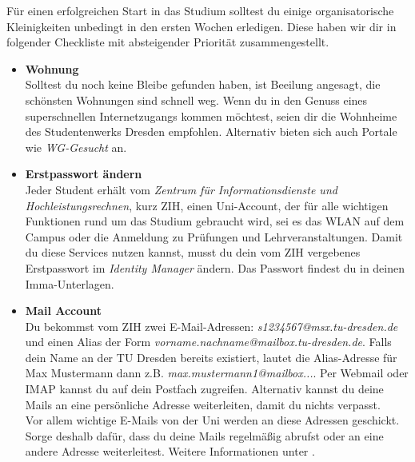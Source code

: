 \newcommand{\checkbox}[1]{\item[$\square$]\textbf{#1}\\}


Für einen erfolgreichen Start in das Studium solltest du einige organisatorische Kleinigkeiten unbedingt in den ersten Wochen erledigen.
Diese haben wir dir in folgender Checkliste mit absteigender Priorität zusammengestellt.

\begin{itemize}[leftmargin=*]

\checkbox{Wohnung}
Solltest du noch keine Bleibe gefunden haben, ist Beeilung angesagt, die schönsten Wohnungen sind schnell weg.
Wenn du in den Genuss eines superschnellen Internetzugangs kommen möchtest, seien dir die Wohnheime  des Studentenwerks Dresden empfohlen. Alternativ bieten sich auch Portale wie \textit{WG-Gesucht}  an.

\checkbox{Erstpasswort ändern}
Jeder Student erhält vom \textit{Zentrum für Informationsdienste und Hochleistungsrechnen}, kurz ZIH, einen Uni-Account, der für alle wichtigen Funktionen rund um das Studium gebraucht wird, sei es das WLAN auf dem Campus oder die Anmeldung zu Prüfungen und Lehrveranstaltungen.
Damit du diese Services nutzen kannst, musst du dein vom ZIH vergebenes Erstpasswort im \textit{Identity Manager}  ändern. Das Passwort findest du in deinen Imma-Unterlagen.

\checkbox{Mail Account}
Du bekommst vom ZIH zwei E-Mail-Adressen:
\textit{s1234567@msx.tu-dresden.de} und einen Alias der Form \textit{vorname.nachname@mailbox.tu-dresden.de}.
Falls dein Name an der TU Dresden bereits existiert, lautet die Alias-Adresse für Max Mustermann dann z.B. \textit{max.mustermann1@mailbox...}.
Per Webmail oder IMAP kannst du auf dein Postfach zugreifen.
Alternativ kannst du deine Mails an eine persönliche Adresse weiterleiten, damit du nichts verpasst. \\
Vor allem wichtige E-Mails von der Uni werden an diese Adressen geschickt. Sorge deshalb dafür, dass du deine Mails regelmäßig abrufst oder an eine andere Adresse weiterleitest. Weitere Informationen unter .


\end{itemize}
